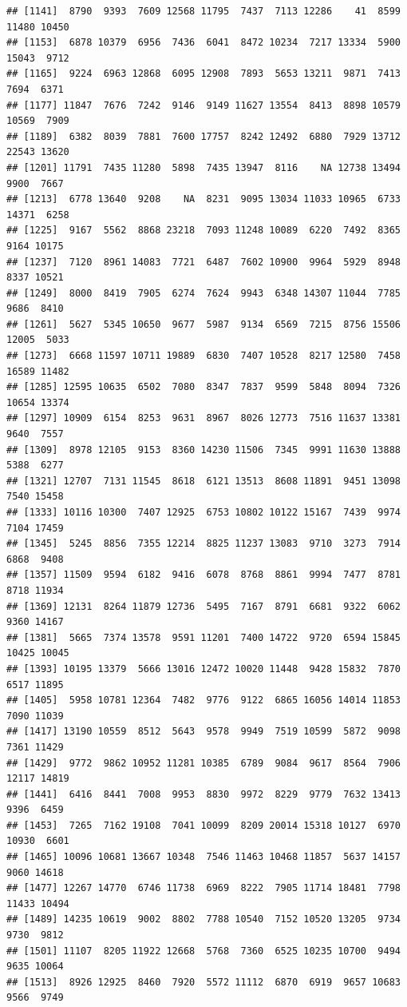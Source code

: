 \documentclass[
]{article}
\begin{document}
\begin{verbatim}
## [1141]  8790  9393  7609 12568 11795  7437  7113 12286    41  8599 11480 10450
## [1153]  6878 10379  6956  7436  6041  8472 10234  7217 13334  5900 15043  9712
## [1165]  9224  6963 12868  6095 12908  7893  5653 13211  9871  7413  7694  6371
## [1177] 11847  7676  7242  9146  9149 11627 13554  8413  8898 10579 10569  7909
## [1189]  6382  8039  7881  7600 17757  8242 12492  6880  7929 13712 22543 13620
## [1201] 11791  7435 11280  5898  7435 13947  8116    NA 12738 13494  9900  7667
## [1213]  6778 13640  9208    NA  8231  9095 13034 11033 10965  6733 14371  6258
## [1225]  9167  5562  8868 23218  7093 11248 10089  6220  7492  8365  9164 10175
## [1237]  7120  8961 14083  7721  6487  7602 10900  9964  5929  8948  8337 10521
## [1249]  8000  8419  7905  6274  7624  9943  6348 14307 11044  7785  9686  8410
## [1261]  5627  5345 10650  9677  5987  9134  6569  7215  8756 15506 12005  5033
## [1273]  6668 11597 10711 19889  6830  7407 10528  8217 12580  7458 16589 11482
## [1285] 12595 10635  6502  7080  8347  7837  9599  5848  8094  7326 10654 13374
## [1297] 10909  6154  8253  9631  8967  8026 12773  7516 11637 13381  9640  7557
## [1309]  8978 12105  9153  8360 14230 11506  7345  9991 11630 13888  5388  6277
## [1321] 12707  7131 11545  8618  6121 13513  8608 11891  9451 13098  7540 15458
## [1333] 10116 10300  7407 12925  6753 10802 10122 15167  7439  9974  7104 17459
## [1345]  5245  8856  7355 12214  8825 11237 13083  9710  3273  7914  6868  9408
## [1357] 11509  9594  6182  9416  6078  8768  8861  9994  7477  8781  8718 11934
## [1369] 12131  8264 11879 12736  5495  7167  8791  6681  9322  6062  9360 14167
## [1381]  5665  7374 13578  9591 11201  7400 14722  9720  6594 15845 10425 10045
## [1393] 10195 13379  5666 13016 12472 10020 11448  9428 15832  7870  6517 11895
## [1405]  5958 10781 12364  7482  9776  9122  6865 16056 14014 11853  7090 11039
## [1417] 13190 10559  8512  5643  9578  9949  7519 10599  5872  9098  7361 11429
## [1429]  9772  9862 10952 11281 10385  6789  9084  9617  8564  7906 12117 14819
## [1441]  6416  8441  7008  9953  8830  9972  8229  9779  7632 13413  9396  6459
## [1453]  7265  7162 19108  7041 10099  8209 20014 15318 10127  6970 10930  6601
## [1465] 10096 10681 13667 10348  7546 11463 10468 11857  5637 14157  9060 14618
## [1477] 12267 14770  6746 11738  6969  8222  7905 11714 18481  7798 11433 10494
## [1489] 14235 10619  9002  8802  7788 10540  7152 10520 13205  9734  9730  9812
## [1501] 11107  8205 11922 12668  5768  7360  6525 10235 10700  9494  9635 10064
## [1513]  8926 12925  8460  7920  5572 11112  6870  6919  9657 10683  9566  9749

\end{verbatim}
\end{document}
